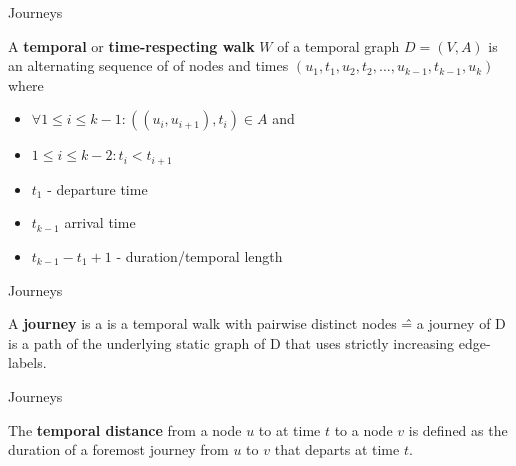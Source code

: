\documentclass{beamer}
\begin{document}
\begin{frame}{Journeys}
	\begin{tcolorbox}[title=Definition: temporal/time respecting walk]
		A \textbf{temporal} or \textbf{time-respecting walk} $W$ of a temporal graph $D = (V, A)$ is an alternating sequence of of nodes and times $(u_1 , t_1 , u_2 , t_2 , ... , u_{k-1} , t_{k-1} , u_k )$
		where 
		\begin{itemize}
			\item $\forall 1 \leq i \leq k - 1: ((u_i , u_{i+1} ), t_i ) \in A$ and
			\item $1 \leq i \leq k - 2: t_i < t_{i + 1}$
		\end{itemize}
	\end{tcolorbox}
	\begin{itemize}
		\item $t_1$ - departure time
		\item $t_{k - 1}$ arrival time
		\item $t_{k - 1} - t_1 + 1$ - duration/temporal length
	\end{itemize}
\end{frame}

\begin{frame}{Journeys}
	\begin{tcolorbox}[title=Definition: Journey]
		A \textbf{journey} is a is a temporal walk with pairwise distinct nodes \^{=} a journey of D is a path of the underlying static graph of D that uses
strictly increasing edge-labels.
	\end{tcolorbox}

\end{frame}

\begin{frame}{Journeys}
	\begin{tcolorbox}[title=Definition: Temporal distance]
    The \textbf{temporal distance} from a node $u$ to at time $t$ to a node $v$ is defined as the duration of a foremost journey from $u$ to $v$ that departs at time $t$.
	\end{tcolorbox}
\end{frame}
\end{document}
